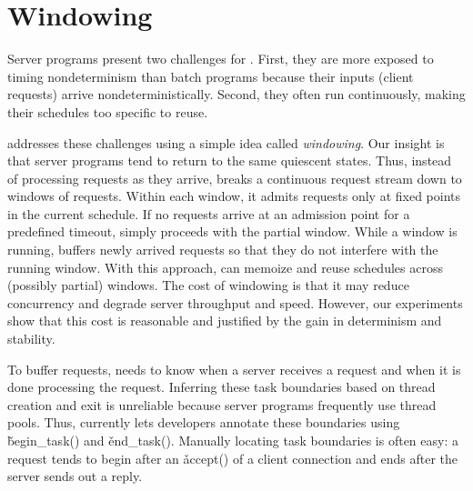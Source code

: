 \vspace{.1in}
\section{Windowing} \label{sec:tern-window}

Server programs present two challenges for \tern.  First, they 
are more exposed to
timing nondeterminism than batch programs because their inputs
(client requests) arrive nondeterministically.  Second, they often run
continuously, making their schedules too specific to reuse.


\tern addresses these challenges using a simple idea called
\emph{windowing}.  Our insight is that server programs tend to return to the
same quiescent states.  Thus, instead of processing requests as they
arrive, \tern breaks a continuous request stream down to windows of
requests.  Within each window, it admits requests only at fixed points in
the current schedule.  If no requests arrive at an admission point for a
predefined timeout, \tern simply proceeds with the partial window.  While a
window is running, \tern buffers newly arrived requests so that they do not
interfere with the running window.  With this approach, \tern can memoize
and reuse schedules across (possibly partial) windows.
The cost of windowing is that it may reduce concurrency
and degrade server throughput and speed.  However, our experiments show
that this cost is reasonable and justified by the gain in determinism
and stability.

To buffer requests, \tern needs to know when a server receives a request
and when it is done processing the request.  Inferring these task
boundaries based on thread creation and exit is unreliable because server
programs frequently use thread pools.  Thus, \tern currently lets
developers annotate these boundaries using \v{begin\_task()} and
\v{end\_task()}.  Manually locating task boundaries is often easy: a
request tends to begin after an \v{accept()} of a client connection and ends
after the server sends out a reply.

